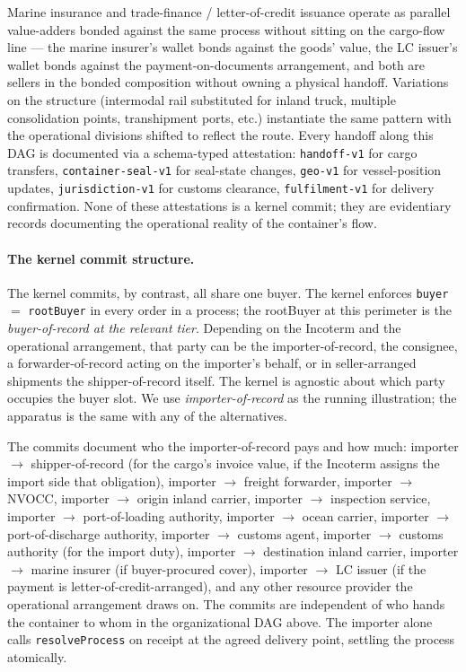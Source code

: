 \documentclass[11pt,a4paper]{article}
\theoremstyle{definition}
\theoremstyle{remark}
\begin{document}
Marine insurance and trade-finance / letter-of-credit issuance
operate as parallel value-adders bonded against the same process
without sitting on the cargo-flow line --- the marine insurer's
wallet bonds against the goods' value, the LC issuer's wallet
bonds against the payment-on-documents arrangement, and both are
sellers in the bonded composition without owning a physical
handoff. Variations on the structure (intermodal rail substituted
for inland truck, multiple consolidation points, transhipment ports,
etc.) instantiate the same pattern with the operational divisions
shifted to reflect the route. Every handoff along this DAG is
documented via a schema-typed attestation: \texttt{handoff-v1} for
cargo transfers, \texttt{container-seal-v1} for seal-state changes,
\texttt{geo-v1} for vessel-position updates,
\texttt{jurisdiction-v1} for customs clearance,
\texttt{fulfilment-v1} for delivery confirmation. None of these
attestations is a kernel commit; they are evidentiary records
documenting the operational reality of the container's flow.

\paragraph{The kernel commit structure.}
The kernel commits, by contrast, all share one buyer. The kernel
enforces \texttt{buyer} $=$ \texttt{rootBuyer} in every order in
a process; the rootBuyer at this perimeter is the
\emph{buyer-of-record at the relevant tier}. Depending on the
Incoterm and the operational arrangement, that party can be the
importer-of-record, the consignee, a forwarder-of-record acting
on the importer's behalf, or in seller-arranged shipments the
shipper-of-record itself. The kernel is agnostic about which
party occupies the buyer slot. We use \emph{importer-of-record}
as the running illustration; the apparatus is the same with any
of the alternatives.

The commits document who the importer-of-record pays and how
much: importer $\to$ shipper-of-record (for the cargo's invoice
value, if the Incoterm assigns the import side that obligation),
importer $\to$ freight forwarder, importer $\to$ NVOCC, importer
$\to$ origin inland carrier, importer $\to$ inspection service,
importer $\to$ port-of-loading authority, importer $\to$ ocean
carrier, importer $\to$ port-of-discharge authority, importer
$\to$ customs agent, importer $\to$ customs authority (for the
import duty), importer $\to$ destination inland carrier, importer
$\to$ marine insurer (if buyer-procured cover), importer $\to$
LC issuer (if the payment is letter-of-credit-arranged), and any
other resource provider the operational arrangement draws on.
The commits are independent of who hands the container to whom in
the organizational DAG above. The importer alone calls
\texttt{resolveProcess} on receipt at the agreed delivery point,
settling the process atomically.
\end{document}

